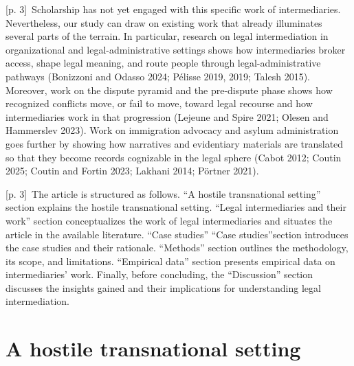 \documentclass[10pt,a4paper]{article}
\begin{document}
{\scriptsize\color{gray} [p. 3]}\ Scholarship has not yet engaged with this specific work of intermediaries. Nevertheless, our study can draw on existing work that already illuminates several parts of the terrain. In particular, research on legal intermediation in organizational and legal-administrative settings shows how intermediaries broker access, shape legal meaning, and route people through legal-administrative pathways (Bonizzoni and Odasso 2024; Pélisse 2019, 2019; Talesh 2015). Moreover, work on the dispute pyramid and the pre-dispute phase shows how recognized conflicts move, or fail to move, toward legal recourse and how intermediaries work in that progression (Lejeune and Spire 2021; Olesen and Hammerslev 2023). Work on immigration advocacy and asylum administration goes further by showing how narratives and evidentiary materials are translated so that they become records cognizable in the legal sphere (Cabot 2012; Coutin 2025; Coutin and Fortin 2023; Lakhani 2014; Pörtner 2021).\par
{\scriptsize\color{gray} [p. 3]}\ The article is structured as follows. “A hostile transnational setting” section explains the hostile transnational setting. “Legal intermediaries and their work” section conceptualizes the work of legal intermediaries and situates the article in the available literature. “Case studies” “Case studies”section introduces the case studies and their rationale. “Methods” section outlines the methodology, its scope, and limitations. “Empirical data” section presents empirical data on intermediaries’ work. Finally, before concluding, the “Discussion” section discusses the insights gained and their implications for understanding legal intermediation.\par
{}\section*{A hostile transnational setting}
\end{document}
